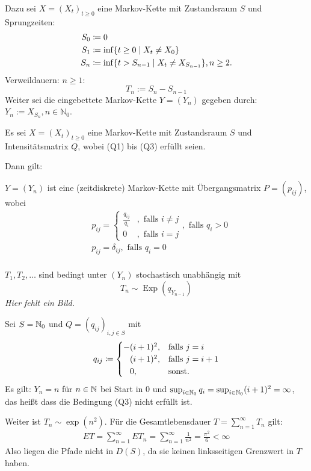 \documentclass[a4paper,twoside,DIV15,BCOR12mm]{scrbook}
\begin{document}
  Dazu sei $X=(X_t)_{t\geq 0}$ eine Markov-Kette mit Zustandsraum $S$ und Sprungzeiten: 
  \begin{align*}
    S_0&\da0 \\
    S_1&\da\inf\{t\geq0\mid X_t\neq X_0\} \\
    S_n&\da\inf\{t>S_{n-1}\mid X_t\neq X_{S_{n-1}} \}, n\geq 2.
  \end{align*}
  Verweildauern: $n\geq 1$:
  \[
  T_n:=S_n-S_{n-1}
  \]
  Weiter sei die eingebettete Markov-Kette $Y=(Y_n)$ gegeben durch: $Y_n:=X_{S_n}, n\in\mathbb N_0$.
  \begin{satz}
    \label{satz8.5}
    Es sei $X=(X_t)_{t\geq0}$ eine Markov-Kette mit Zustandsraum $S$ und Intensitätsmatrix $Q$, 
    wobei (Q1) bis (Q3) erfüllt seien.

    Dann gilt:
    \begin{enuma}
    \item $Y=(Y_n)$ ist eine (zeitdiskrete) Markov-Kette mit Übergangsmatrix $P=(p_{ij})$, wobei
      \begin{align*}
	& p_{ij}=\begin{cases}
	\frac{q_{ij}}{q_i} & , \text{ falls } i\neq j \\
	0 & , \text{ falls } i=j
	\end{cases} , \text{ falls } q_i>0 \\
	& p_{ij}=\delta_{ij}, \text{ falls } q_i=0 \\
      \end{align*}
    \item $T_1,T_2,\dots$ sind bedingt unter $(Y_n)$ stochastisch unabhängig mit
      \[
      T_n\sim \operatorname{Exp}(q_{Y_{n-1}})
      \]
      \emph{Hier fehlt ein Bild.}
    \end{enuma}
  \end{satz}

\begin{beispiel}
Sei $S=\mathbb{N}_0$ und $Q=(q_{ij})_{i,j\in S}$ mit
\begin{align*}
q_{ij} \da 
\begin{cases}
-(i+1)^2, & \text{falls } j=i \\
\phantom - (i+1)^2, & \text{falls } j=i+1 \\
\phantom - 0, &\text{sonst.}
\end{cases}
\end{align*}
Es gilt: $Y_n=n$ für $n\in\mathbb{N}$ bei Start in 0 und $\sup_{i\in\mathbb{N}_0} q_i = \sup_{i\in \mathbb{N}_0} (i+1)^2 = \infty$, das heißt dass die Bedingung (Q3) nicht erfüllt ist.

Weiter ist $T_n\sim \exp(n^2)$. Für die Gesamtlebensdauer $T=\sum_{n=1}^\infty T_n$ gilt:
\begin{align*}
ET = \sum_{n=1}^\infty  E T_n = \sum_{n=1}^\infty \frac1{n^2} = \frac {\pi^2}6 < \infty
\end{align*}
Also liegen die Pfade nicht in $D(S)$, da sie keinen linksseitigen Grenzwert in $T$ haben.
\end{beispiel}
\end{document}

